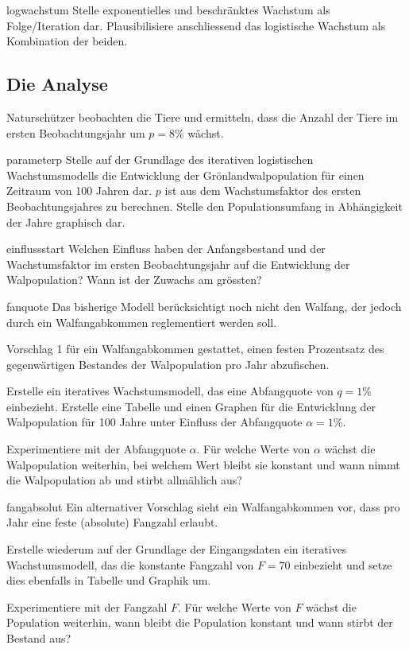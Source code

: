 \documentclass[%
<<<<<<< Updated upstream
11pt,%
twoside,%
titlepage,%
german,%
headsepline%
]{scrartcl}
\begin{document}
\begin{uebenv}{logwachstum}
Stelle exponentielles und beschränktes Wachstum als Folge/Iteration dar. Plausibilisiere anschliessend das logistische Wachstum als Kombination der beiden.
\end{uebenv}

\subsection{Die Analyse}
Naturschützer beobachten die Tiere und ermitteln, dass die Anzahl der Tiere im ersten Beobachtungsjahr um $p=8\%$ wächst.

\begin{uebenv}{parameterp}
    Stelle auf der Grundlage des iterativen logistischen Wachstumsmodells die Entwicklung der Grönlandwalpopulation für einen Zeitraum von 100 Jahren dar. $p$ ist aus dem Wachstumsfaktor des ersten Beobachtungsjahres zu berechnen. Stelle den Populationsumfang in Abhängigkeit der Jahre graphisch dar.
\end{uebenv}

\begin{uebenv}{einflussstart}
    Welchen Einfluss haben der Anfangsbestand und der Wachstumsfaktor im ersten Beobachtungsjahr auf die Entwicklung der Walpopulation? Wann ist der Zuwachs am grössten?
\end{uebenv}

\begin{uebenv}{fanquote}
    Das bisherige Modell berücksichtigt noch nicht den Walfang, der jedoch durch ein Walfangabkommen reglementiert werden soll.

    Vorschlag 1 für ein Walfangabkommen gestattet, einen festen Prozentsatz des gegenwärtigen Bestandes der Walpopulation pro Jahr abzufischen.

    Erstelle ein iteratives Wachstumsmodell, das eine Abfangquote von $q=1\%$ einbezieht. Erstelle eine Tabelle und einen Graphen für die Entwicklung der Walpopulation für 100 Jahre unter Einfluss der Abfangquote $\alpha=1\%$.

    Experimentiere mit der Abfangquote $\alpha$. Für welche Werte von $\alpha$ wächst die Walpopulation weiterhin, bei welchem Wert bleibt sie konstant und wann nimmt die Walpopulation ab und stirbt allmählich aus?
\end{uebenv}

\begin{uebenv}{fangabsolut}
    Ein alternativer Vorschlag sieht ein Walfangabkommen vor, dass pro Jahr eine feste (absolute) Fangzahl erlaubt.

    Erstelle wiederum auf der Grundlage der Eingangsdaten ein iteratives Wachstumsmodell, das die konstante Fangzahl von $F=70$ einbezieht und setze dies ebenfalls in Tabelle und Graphik um.

Experimentiere mit der Fangzahl $F$. Für welche Werte von $F$ wächst die Population weiterhin, wann bleibt die Population konstant und wann stirbt der Bestand aus?
\end{uebenv}
\end{document}
